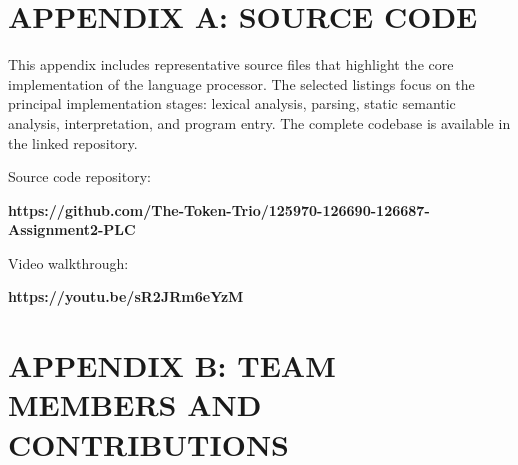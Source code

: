 \chapter*{APPENDIX A: SOURCE CODE}

This appendix includes representative source files that highlight the core
implementation of the language processor. The selected listings focus on the
principal implementation stages: lexical analysis, parsing, static semantic
analysis, interpretation, and program entry. The complete codebase is
available in the linked repository.

Source code repository:

\begin{center}
\textbf{https://github.com/The-Token-Trio/125970-126690-126687-Assignment2-PLC}
\end{center}

Video walkthrough:

\begin{center}
\textbf{https://youtu.be/sR2JRm6eYzM}
\end{center}


\chapter*{APPENDIX B: TEAM MEMBERS AND CONTRIBUTIONS}

